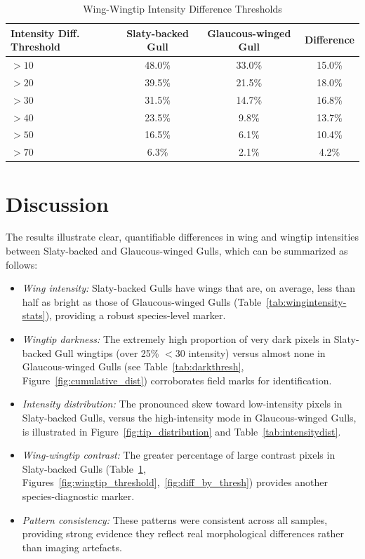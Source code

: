 \documentclass[a4paper,12pt]{report}
\begin{document}
\begin{table}[H]
    \centering
    \caption{Wing-Wingtip Intensity Difference Thresholds}
    \label{tab:diffthreshold}
    \begin{tabular}{lccc}
        \toprule
        Intensity Diff. Threshold & Slaty-backed Gull & Glaucous-winged Gull & Difference \\
        \midrule
        $>10$  & 48.0\% & 33.0\% & 15.0\% \\
        $>20$  & 39.5\% & 21.5\% & 18.0\% \\
        $>30$  & 31.5\% & 14.7\% & 16.8\% \\
        $>40$  & 23.5\% & 9.8\%  & 13.7\% \\
        $>50$  & 16.5\% & 6.1\%  & 10.4\% \\
        $>70$  & 6.3\%  & 2.1\%  & 4.2\%  \\
        \bottomrule
    \end{tabular}
\end{table}

\section{Discussion}

The results illustrate clear, quantifiable differences in wing and wingtip intensities between Slaty-backed and Glaucous-winged Gulls, which can be summarized as follows:

\begin{itemize}
    \item \emph{Wing intensity:} Slaty-backed Gulls have wings that are, on average, less than half as bright as those of Glaucous-winged Gulls (Table~\ref{tab:wingintensity-stats}), providing a robust species-level marker.
    \item \emph{Wingtip darkness:} The extremely high proportion of very dark pixels in Slaty-backed Gull wingtips (over 25\% $<$30 intensity) versus almost none in Glaucous-winged Gulls (see Table~\ref{tab:darkthresh}, Figure~\ref{fig:cumulative_dist}) corroborates field marks for identification.
    \item \emph{Intensity distribution:} The pronounced skew toward low-intensity pixels in Slaty-backed Gulls, versus the high-intensity mode in Glaucous-winged Gulls, is illustrated in Figure~\ref{fig:tip_distribution} and Table~\ref{tab:intensitydist}.
    \item \emph{Wing-wingtip contrast:} The greater percentage of large contrast pixels in Slaty-backed Gulls (Table~\ref{tab:diffthreshold}, Figures~\ref{fig:wingtip_threshold},~\ref{fig:diff_by_thresh}) provides another species-diagnostic marker.
    \item \emph{Pattern consistency:} These patterns were consistent across all samples, providing strong evidence they reflect real morphological differences rather than imaging artefacts.
\end{itemize}
\end{document}
